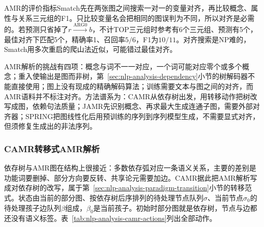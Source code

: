 AMR的评价指标Smatch先在两张图之间搜索一对一的变量对齐，再比较概念、属性与关系三元组的F1。只比较变量名会把相同的图误判为不同，所以对齐是必需的。若预测只省掉了$r\xrightarrow{\mathrm{ARG0}}b$，不计TOP三元组时参考有6个三元组、预测有5个，最佳对齐下匹配5个，精确率1、召回率$5/6$，F1为$10/11$。对齐搜索是NP难的，Smatch用多次重启的爬山法近似，可能错过最佳对齐。

AMR解析的挑战有四项：概念与词不一一对应，一个词可能对应零个或多个概念；重入使输出是图而非树，第~\ref{sec:nlp-analysis-dependency}小节的树解码器不能直接使用；图上没有现成的精确解码算法；训练需要文本与图之间的对齐，而AMR语料并不标注对齐。方法谱系为：CAMR从依存树出发，用转移动作把树改写成图，依赖句法质量；JAMR先识别概念、再求最大生成连通子图，需要外部对齐器；SPRING把图线性化后用预训练的序列到序列模型生成，不需要显式对齐，但须修复生成出的非法序列。

\subsubsection{CAMR转移式AMR解析}
\label{sec:nlp-analysis-camr}

依存树与AMR图在结构上很接近：多数依存弧对应一条语义关系，主要的差别是功能词要删掉、部分方向要反转、共享论元需要加边。CAMR据此把AMR解析写成对依存树的改写，属于第~\ref{sec:nlp-analysis-paradigm-transition}小节的转移范式。状态由当前的部分图、按依存树后序排列的待处理节点队列$\sigma$、当前节点$\sigma_0$的待处理孩子边队列$\beta$组成，$\beta_0$是当前孩子。初始时部分图就是依存树，节点与边都还没有语义标签。表~\ref{tab:nlp-analysis-camr-actions}列出全部动作。

